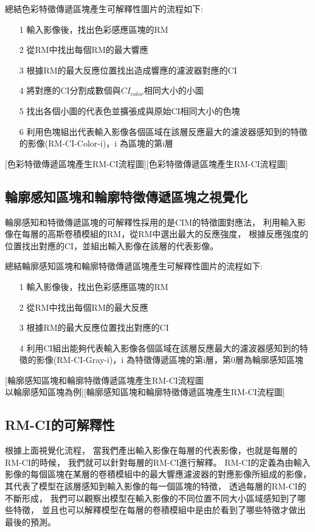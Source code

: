 \documentclass[class=NCU_thesis, crop=false]{standalone}
\begin{document}
	總結色彩特徵傳遞區塊產生可解釋性圖片的流程如下:
	\begin{itemize}
		\item [1]
		輸入影像後，找出色彩感應區塊的RM
		\item [2]
		從RM中找出每個RM的最大響應
		\item [3]
		根據RM的最大反應位置找出造成響應的濾波器對應的CI
		\item [4]
		將對應的CI分割成數個與$CI_{color}$相同大小的小圖
		\item [5]
		找出各個小圖的代表色並擴張成與原始CI相同大小的色塊
		\item [6]
		利用色塊組出代表輸入影像各個區域在該層反應最大的濾波器感知到的特徵的影像(RM-CI-Color-i)，i 為區塊的第i層
	\end{itemize}

	[色彩特徵傳遞區塊產生RM-CI流程圖][色彩特徵傳遞區塊產生RM-CI流程圖]
	\pagebreak

	\subsection{輪廓感知區塊和輪廓特徵傳遞區塊之視覺化}
	輪廓感知和特徵傳遞區塊的可解釋性採用的是CIM的特徵圖對應法，
	利用輸入影像在每層的高斯卷積模組的RM，從RM中選出最大的反應強度，
	根據反應強度的位置找出對應的CI，並組出輸入影像在該層的代表影像。

	總結輪廓感知區塊和輪廓特徵傳遞區塊產生可解釋性圖片的流程如下:
	\begin{itemize}
		\item [1]
		輸入影像後，找出色彩感應區塊的RM
		\item [2]
		從RM中找出每個RM的最大反應
		\item [3]
		根據RM的最大反應位置找出對應的CI
		\item [4]
		利用CI組出能夠代表輸入影像各個區域在該層反應最大的濾波器感知到的特徵的影像(RM-CI-Gray-i)，i 為特徵傳遞區塊的第i層，第0層為輪廓感知區塊
	\end{itemize}

	[輪廓感知區塊和輪廓特徵傳遞區塊產生RM-CI流程圖 \\ 
	以輪廓感知區塊為例][輪廓感知區塊和輪廓特徵傳遞區塊產生RM-CI流程圖]

\pagebreak

	\subsection{RM-CI的可解釋性}
	根據上面視覺化流程，
	當我們產出輸入影像在每層的代表影像，也就是每層的RM-CI的時候，
	我們就可以針對每層的RM-CI進行解釋。
	RM-CI的定義為由輸入影像的每個區塊在某層的卷積模組中的最大響應濾波器的對應影像所組成的影像，
	其代表了模型在該層感知到輸入影像的每一個區塊的特徵，
	透過每層的RM-CI的不斷形成，
	我們可以觀察出模型在輸入影像的不同位置不同大小區域感知到了哪些特徵，
	並且也可以解釋模型在每層的卷積模組中是由於看到了哪些特徵才做出最後的預測。
\end{document}
